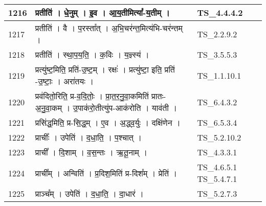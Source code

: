 \documentclass[17pt]{extarticle}
\begin{document}
\begin{longtable}{||p{0.4in}||p{4.9in}||p{0.9in}||}
    \hline
        
    1216 & प्रतीति॑   ।   धे॒नुम्   ।   इ॒व   ।   आ॒य॒तीमित्या᳚{-}य॒तीम्   ।    & TS\_4.4.4.2       \\
    
    \hline
        
    1217 & प्रतीति॑   ।   वै   ।   प॒रस्ता᳚त्   ।   अ॒भि॒चर॑न्त॒मित्य॑भि{-}चर॑न्तम्   ।    & TS\_2.2.9.2       \\
    
    \hline
        
    1218 & प्रतीति॑   ।   स्था॒प॒य॒ति॒   ।   क॒विः   ।   य॒ज्ञ्स्य॑   ।    & TS\_3.5.5.3       \\
    
    \hline
        
    1219 & प्रत्यु॑ष्ट॒मिति॒ प्रति॑{-}उ॒ष्ट॒म्   ।   रक्षः॑   ।   प्रत्यु॑ष्टा॒ इति॒ प्रति॑ {-}उ॒ष्टाः॒   ।   अरा॑तयः   ।    & TS\_1.1.10.1       \\
    
    \hline
        
    1220 & प्रव॑दितो॒रिति॒ प्र{-}व॒दि॒तोः॒   ।   प्रा॒त॒र॒नु॒वा॒कमिति॑ प्रातः{-}अ॒नु॒वा॒कम्   ।   उ॒पाक॑रो॒तीत्यु॑प{-}आक॑रोति   ।   याव॑ती   ।    & TS\_6.4.3.2       \\
    
    \hline
        
    1221 & प्रसि॑द्ध॒मिति॒ प्र{-}सि॒द्ध॒म्   ।   ए॒व   ।   अ॒द्ध्व॒र्युः   ।   दक्षि॑णेन   ।    & TS\_6.5.3.4       \\
    
    \hline
        
    1222 & प्राचीः᳚   ।   उपेति॑   ।   द॒धा॒ति॒   ।   प॒श्चात्   ।    & TS\_5.2.10.2       \\
    
    \hline
        
    1223 & प्राची᳚   ।   दि॒शाम्   ।   व॒स॒न्तः   ।   ऋ॒तू॒नाम्   ।    & TS\_4.3.3.1       \\
    
    \hline
        
    1224 & प्राची᳚म्   ।   अन्विति॑   ।   प्र॒दिश॒मिति॑ प्र{-}दिश᳚म्   ।   प्रेति॑   ।    & TS\_4.6.5.1 TS\_5.4.7.1       \\
    
    \hline
        
    1225 & प्राञ्च᳚म्   ।   उपेति॑   ।   द॒धा॒ति॒   ।   दा॒धार॑   ।    & TS\_5.2.7.3       \\
    

\end{longtable}
\end{document}
